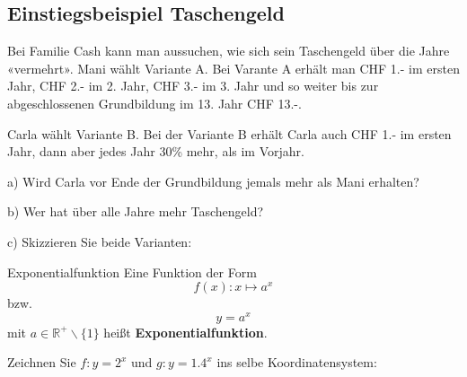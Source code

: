 

\newpage

\subsection{Einstiegsbeispiel Taschengeld}

Bei Familie Cash kann man aussuchen, wie sich sein Taschengeld über
die Jahre «vermehrt». Mani wählt Variante A. Bei Varante A erhält man
CHF 1.- im ersten Jahr, CHF 2.- im 2. Jahr, CHF 3.- im 3. Jahr und so
weiter bis zur abgeschlossenen Grundbildung im 13. Jahr CHF 13.-.

Carla wählt Variante B. Bei der Variante B erhält Carla auch CHF 1.-
im ersten Jahr, dann aber jedes Jahr 30\% mehr, als im Vorjahr.

a) Wird Carla vor Ende der Grundbildung jemals mehr als Mani erhalten?


b) Wer hat über alle Jahre mehr Taschengeld?


c) Skizzieren Sie beide Varianten:





\newpage
\begin{definition}{Exponentialfunktion}{}
  Eine Funktion der Form $$f(x): x \mapsto a^x$$
  bzw. $$y = a^x$$
  mit $a\in \mathbb{R}^{+}\backslash\{1\}$ heißt \textbf{Exponentialfunktion}.
\end{definition}

Zeichnen Sie $f: y=2^x$ und $g: y=1.4^x$ ins selbe Koordinatensystem:





